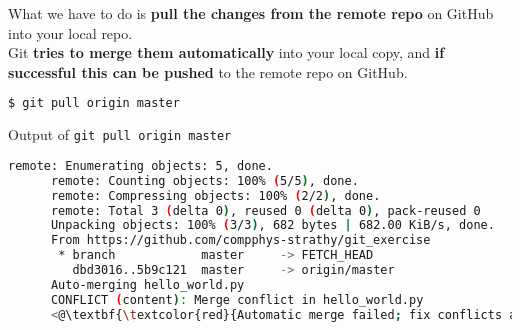 \begin{frame}[fragile]
\emptyframetitle

  What we have to do is \textbf{pull the changes from the remote repo} on GitHub into your local repo.\\[0.25cm]

  Git \textbf{tries to merge them automatically} into your local copy, and \textbf{if successful this can be pushed} to the remote repo on GitHub.

  \begin{lstlisting}[language=bash]
    $ git pull origin master
  \end{lstlisting}
  \vspace*{-0.25cm}
  \begin{block}{Output of \texttt{git pull origin master}}
    \begin{lstlisting}[language=bash, basicstyle=\tiny\ttfamily]
      remote: Enumerating objects: 5, done.
      remote: Counting objects: 100% (5/5), done.
      remote: Compressing objects: 100% (2/2), done.
      remote: Total 3 (delta 0), reused 0 (delta 0), pack-reused 0
      Unpacking objects: 100% (3/3), 682 bytes | 682.00 KiB/s, done.
      From https://github.com/compphys-strathy/git_exercise
       * branch            master     -> FETCH_HEAD
         dbd3016..5b9c121  master     -> origin/master
      Auto-merging hello_world.py
      CONFLICT (content): Merge conflict in hello_world.py
      <@\textbf{\textcolor{red}{Automatic merge failed; fix conflicts and then commit the result.}}@>
    \end{lstlisting}
  \end{block}

\end{frame}


